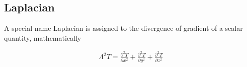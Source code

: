 \subsection{Laplacian}

A special name Laplacian is assigned to the divergence of gradient of a scalar quantity, mathematically


\begin{eqnarray}
\Lambda^2 T = \frac{\partial^2 T}{\partial x^2}  +\frac{\partial^2 T}{\partial y^2} +\frac{\partial^2 T}{\partial z^2} \\ \nonumber
\end{eqnarray}





\bye




















                                                                   



                                       




                                    




























 
